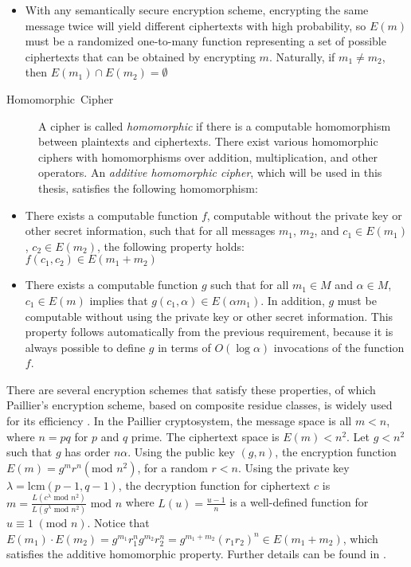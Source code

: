 \begin{itemize}
\item With any semantically secure encryption scheme, encrypting the same
message twice will yield different ciphertexts with high probability,
so $E(m)$ must be a randomized one-to-many function representing
a set of possible ciphertexts that can be obtained by encrypting $m$.
Naturally, if $m_{1}\neq m_{2}$, then $E(m_{1})\cap E(m_{2})=\emptyset$ \end{itemize}
\begin{description}
\item [{Homomorphic~Cipher}] A cipher is called \emph{homomorphic} if
there is a computable homomorphism between plaintexts and ciphertexts.
There exist various homomorphic ciphers with homomorphisms over addition,
multiplication, and other operators. An \emph{additive homomorphic
cipher}, which will be used in this thesis, satisfies the following
homomorphism:\end{description}
\begin{itemize}
\item There exists a computable function $f$, computable without the private
key or other secret information, such that for all messages $m_{1}$,
$m_{2}$, and $c_{1}\in E(m_{1})$, $c_{2}\in E(m_{2})$, the following
property holds:\\
 $f\left(c_{1},c_{2}\right)\in E(m_{1}+m_{2})$ 
\item There exists a computable function $g$ such that for all $m_{1}\in M$
and $\alpha\in M$, $c_{1}\in E(m)$ implies that $g(c_{1},\alpha)\in E(\alpha m_{1})$.
In addition, $g$ must be computable without using the private key
or other secret information. This property follows automatically from
the previous requirement, because it is always possible to define
$g$ in terms of $O(\log\alpha)$ invocations of the function $f$. 
\end{itemize}
There are several encryption schemes that satisfy these properties,
of which Paillier's encryption scheme, based on composite residue
classes, is widely used for its efficiency \cite{Paillier99}. In
the Paillier cryptosystem, the message space is all $m<n$, where
$n=pq$ for $p$ and $q$ prime. The ciphertext space is $E(m)<n^{2}$.
Let $g<n^{2}$ such that $g$ has order $n\alpha$. Using the public
key $(g,n)$, the encryption function $E(m)=g^{m}r^{n}\left(\mbox{mod }n^{2}\right)$,
for a random $r<n$. Using the private key $\lambda=\mbox{lcm}(p-1,q-1)$,
the decryption function for ciphertext $c$ is $m=\frac{L\left(c^{\lambda}\mbox{ mod }n^{2}\right)}{L\left(g^{\lambda}\mbox{ mod }n^{2}\right)}\mbox{ mod }n$
where $L(u)=\frac{u-1}{n}$ is a well-defined function for $u\equiv1\;(\mbox{mod }n)$.
Notice that $E(m_{1})\cdot E(m_{2})=g^{m_{1}}r_{1}^{n}g^{m_{2}}r_{2}^{n}=g^{m_{1}+m_{2}}(r_{1}r_{2})^{n}\in E(m_{1}+m_{2})$,
which satisfies the additive homomorphic property. Further details
can be found in \cite{Paillier99}.


